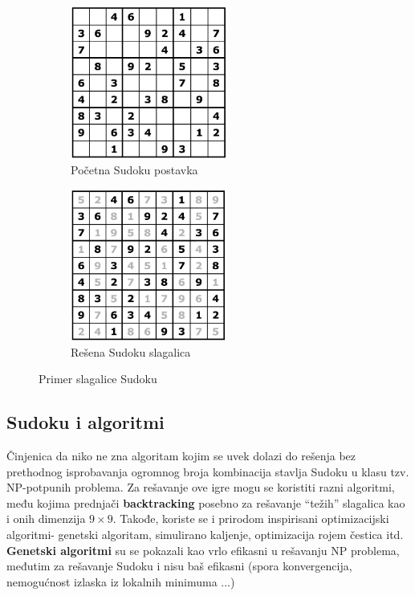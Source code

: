 \documentclass[a4paper]{article}
\begin{document}
\begin{figure}[h]

\begin{subfigure}{0.5\textwidth}
\includegraphics[width=0.8\linewidth, height=5cm]{primer_sudoku_neresen.png} 
\caption{Početna Sudoku postavka}
\label{fig:subim1}
\end{subfigure}
\begin{subfigure}{0.5\textwidth}
\includegraphics[width=0.8\linewidth, height=5cm]{primer_sudoku_resen.png}
\caption{Rešena Sudoku slagalica}
\label{fig:subim2}
\end{subfigure}

\caption{Primer slagalice Sudoku}
\label{fig:image2}
\end{figure}

\subsection{Sudoku i algoritmi}
Činjenica da niko ne zna algoritam kojim se uvek dolazi do rešenja bez prethodnog isprobavanja ogromnog broja kombinacija stavlja Sudoku u klasu tzv. NP-potpunih problema. Za rešavanje ove igre mogu se koristiti razni algoritmi, među kojima prednjači \textbf{backtracking} posebno za rešavanje “težih” slagalica kao i onih dimenzija $9\times9$. Takođe, koriste se i prirodom inspirisani optimizacijski algoritmi- genetski algoritam, simulirano kaljenje, optimizacija rojem čestica itd. \textbf{Genetski algoritmi} su se pokazali kao vrlo efikasni u rešavanju NP problema, međutim za rešavanje Sudoku i nisu baš efikasni (spora konvergencija, nemogućnost izlaska iz lokalnih minimuma ...)
\end{document}
